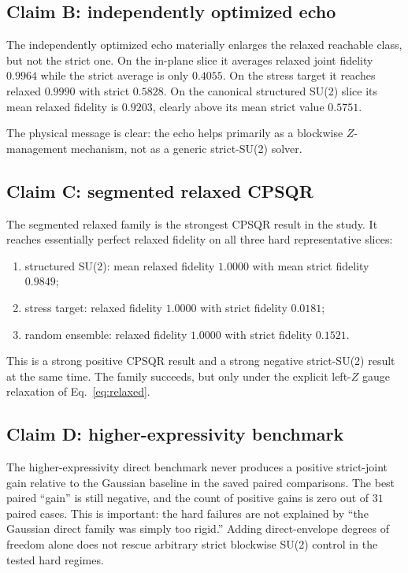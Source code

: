 \documentclass[aps,pra,twocolumn,reprint,floatfix,amsmath,amssymb]{revtex4-2}
\begin{document}
\subsection{Claim B: independently optimized echo}
The independently optimized echo materially enlarges the relaxed reachable class, but not the strict one.  On the in-plane slice it averages relaxed joint fidelity $0.9964$ while the strict average is only $0.4055$.  On the stress target it reaches relaxed $0.9990$ with strict $0.5828$.  On the canonical structured SU(2) slice its mean relaxed fidelity is $0.9203$, clearly above its mean strict value $0.5751$.

The physical message is clear: the echo helps primarily as a blockwise $Z$-management mechanism, not as a generic strict-SU(2) solver.

\subsection{Claim C: segmented relaxed CPSQR}
The segmented relaxed family is the strongest CPSQR result in the study.  It reaches essentially perfect relaxed fidelity on all three hard representative slices:
\begin{enumerate}
\item structured SU(2): mean relaxed fidelity $1.0000$ with mean strict fidelity $0.9849$;
\item stress target: relaxed fidelity $1.0000$ with strict fidelity $0.0181$;
\item random ensemble: relaxed fidelity $1.0000$ with strict fidelity $0.1521$.
\end{enumerate}
This is a strong positive CPSQR result and a strong negative strict-SU(2) result at the same time.  The family succeeds, but only under the explicit left-$Z$ gauge relaxation of Eq.~\eqref{eq:relaxed}.

\subsection{Claim D: higher-expressivity benchmark}
The higher-expressivity direct benchmark never produces a positive strict-joint gain relative to the Gaussian baseline in the saved paired comparisons.  The best paired ``gain'' is still negative, and the count of positive gains is zero out of $31$ paired cases.  This is important: the hard failures are not explained by ``the Gaussian direct family was simply too rigid.''  Adding direct-envelope degrees of freedom alone does not rescue arbitrary strict blockwise SU(2) control in the tested hard regimes.
\end{document}
